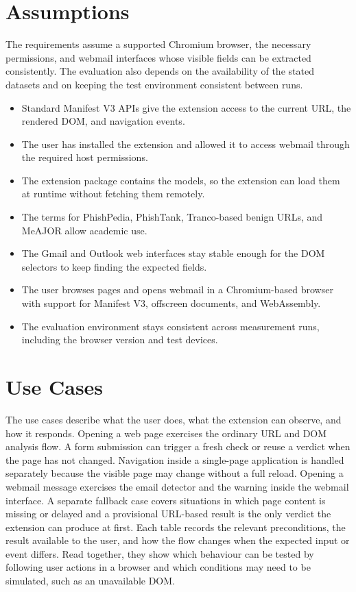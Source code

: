 \documentclass{FastFyp}
\begin{document}
\section{Assumptions}
The requirements assume a supported Chromium browser, the necessary permissions, and webmail interfaces whose visible fields can be extracted consistently. The evaluation also depends on the availability of the stated datasets and on keeping the test environment consistent between runs.
\begin{itemize}
    \item Standard Manifest V3 APIs give the extension access to the current URL, the rendered DOM, and navigation events.
    \item The user has installed the extension and allowed it to access webmail through the required host permissions.
    \item The extension package contains the models, so the extension can load them at runtime without fetching them remotely.
    \item The terms for PhishPedia, PhishTank, Tranco-based benign URLs, and MeAJOR allow academic use.
    \item The Gmail and Outlook web interfaces stay stable enough for the DOM selectors to keep finding the expected fields.
    \item The user browses pages and opens webmail in a Chromium-based browser with support for Manifest V3, offscreen documents, and WebAssembly.
    \item The evaluation environment stays consistent across measurement runs, including the browser version and test devices.
\end{itemize}

\section{Use Cases}
The use cases describe what the user does, what the extension can observe, and how it responds. Opening a web page exercises the ordinary URL and DOM analysis flow. A form submission can trigger a fresh check or reuse a verdict when the page has not changed. Navigation inside a single-page application is handled separately because the visible page may change without a full reload. Opening a webmail message exercises the email detector and the warning inside the webmail interface. A separate fallback case covers situations in which page content is missing or delayed and a provisional URL-based result is the only verdict the extension can produce at first. Each table records the relevant preconditions, the result available to the user, and how the flow changes when the expected input or event differs. Read together, they show which behaviour can be tested by following user actions in a browser and which conditions may need to be simulated, such as an unavailable DOM.
\end{document}
